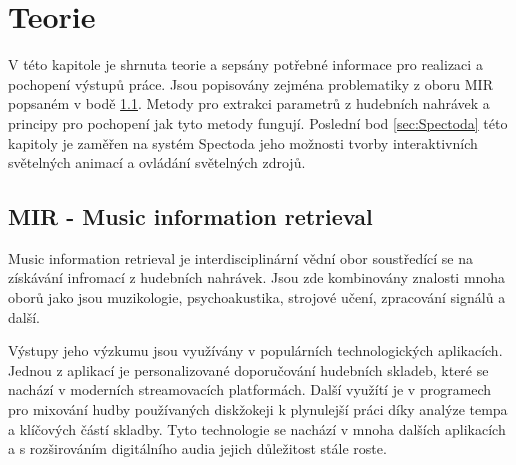 \chapter{Teorie} \label{sec:Teorie}

V této kapitole je shrnuta teorie a sepsány potřebné informace pro realizaci a pochopení výstupů práce. Jsou popisovány zejména problematiky z oboru \acs{MIR} popsaném v bodě \ref{sec:MIR}. Metody pro extrakci parametrů z hudebních nahrávek a principy pro pochopení jak tyto metody fungují. Poslední bod \ref{sec:Spectoda} této kapitoly je zaměřen na systém Spectoda jeho možnosti tvorby interaktivních světelných animací a ovládání světelných zdrojů. 

\section{MIR - Music information retrieval} \label{sec:MIR}
    Music information retrieval je interdisciplinární vědní obor soustředící se na získávání infromací z hudebních nahrávek.
    Jsou zde kombinovány znalosti mnoha oborů jako jsou muzikologie, psychoakustika, strojové učení, zpracování signálů a další. 
    
    Výstupy jeho výzkumu jsou využívány v populárních technologických aplikacích. 
    Jednou z aplikací je personalizované doporučování hudebních skladeb, které se nachází v moderních streamovacích platformách.
    Další využítí je v programech pro mixování hudby používaných diskžokeji k plynulejší práci díky analýze tempa a klíčových částí skladby.
    Tyto technologie se nachází v mnoha dalších aplikacích a s rozširováním digitálního audia jejich důležitost stále roste.
    
